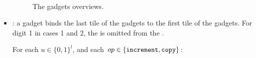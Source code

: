 \begin{itemize}
\begin{figure}[H]
            {}%
            ~
            \caption{\label{fig:first_warp_gadgets_overviews} The {\firstwarp} gadgets overviews.}
        \end{figure}



        \item {\warpbridge}: a {\warpbridge} gadget binds the last tile of the {\firstwarp} gadgets to the
             first tile of the {\secondwarp} gadgets. For digit 1 in cases 1 and 2, the
             {\warpbridge} is omitted from the {\warpunit}.

        For each $u \in \{0, 1\}^l$, and each $op \in \{ {\tt increment, copy } \}$:
        \begin{itemize}


\end{itemize}
\end{itemize}
